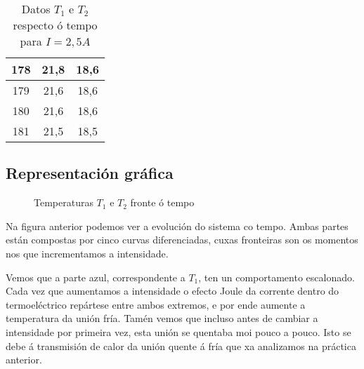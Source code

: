 \documentclass[12pt, a4paper, titlepage]{article}
\begin{document}
\begin{table}[H]
\begin{minipage}[c]{0,24\textwidth}
\begin{table}[H]
{\begin{tabular}{|c|c|c|}
        178 & 21,8 & 18,6 \\ \hline
        179 & 21,6 & 18,6 \\ \hline
        180 & 21,6 & 18,6 \\ \hline
        181 & 21,5 & 18,5 \\ \hline
        \end{tabular}}
        \end{table}
    \end{minipage}
    \begin{minipage}[c]{0,24\textwidth}
      \begin{table}[H]
        \end{table}
    \end{minipage}
    \caption{Datos $T_1$ e $T_2$ respecto ó tempo para $I = 2,5A$}
    \label{cad:t_i_25}
  \end{table}

  \subsection{Representación gráfica}

  \begin{figure}[H]
    \hspace{12pt}
    
    \caption{Temperaturas $T_1$ e $T_2$ fronte ó tempo}
    \label{fig:todo}
  \end{figure}

  Na figura anterior podemos ver a evolución do sistema co tempo. Ambas partes están compostas por cinco curvas diferenciadas, cuxas fronteiras son os momentos nos que incrementamos a intensidade.

  Vemos que a parte azul, correspondente a $T_1$, ten un comportamento escalonado. Cada vez que aumentamos a intensidade o efecto Joule da corrente dentro do termoeléctrico repártese entre ambos extremos, e por ende aumente a temperatura da unión fría. Tamén vemos que incluso antes de cambiar a intensidade por primeira vez, esta unión se quentaba moi pouco a pouco. Isto se debe á transmisión de calor da unión quente á fría que xa analizamos na práctica anterior.
\end{document}
